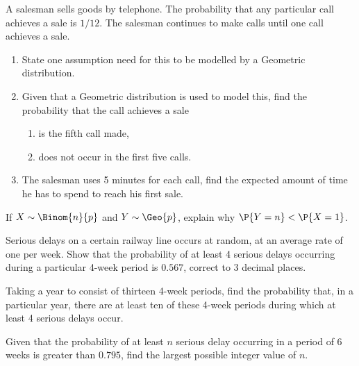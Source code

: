 \begin{problem}
    A salesman sells goods by telephone. The probability that any particular call achieves a sale is $1/12$. The salesman continues to make calls until one call achieves a sale.

    \begin{enumerate}
        \item State one assumption need for this to be modelled by a Geometric distribution.
        \item Given that a Geometric distribution is used to model this, find the probability that the call achieves a sale
        \begin{enumerate}
            \item is the fifth call made,
            \item does not occur in the first five calls.
        \end{enumerate}
        \item The salesman uses 5 minutes for each call, find the expected amount of time he has to spend to reach his first sale.
    \end{enumerate}
\end{problem}

\begin{problem}
    If $X \sim \Binom{n}{p}$ and $Y \sim \Geo{p}$, explain why $\P{Y = n} < \P{X = 1}$.
\end{problem}

\begin{problem}
    Serious delays on a certain railway line occurs at random, at an average rate of one per week. Show that the probability of at least 4 serious delays occurring during a particular 4-week period is $0.567$, correct to 3 decimal places.

    Taking a year to consist of thirteen 4-week periods, find the probability that, in a particular year, there are at least ten of these 4-week periods during which at least 4 serious delays occur.

    Given that the probability of at least $n$ serious delay occurring in a period of 6 weeks is greater than $0.795$, find the largest possible integer value of $n$.
\end{problem}


